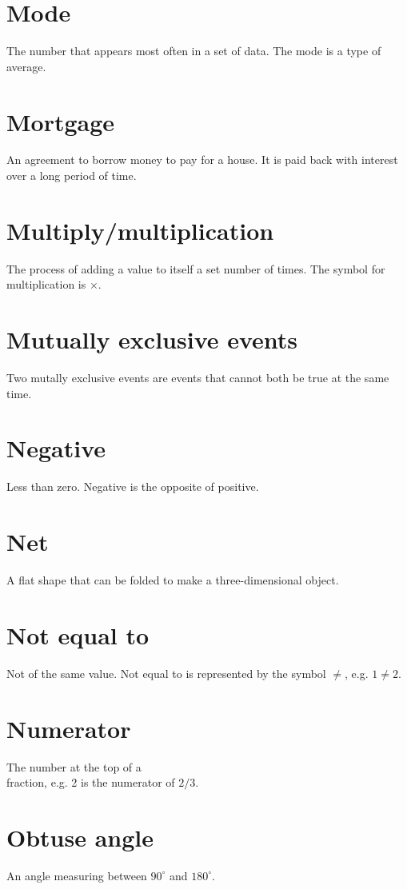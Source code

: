 \documentclass[10pt]{article}
\begin{document}
\section*{Mode}
The number that appears most often in a set of data. The mode is a type of average.

\section*{Mortgage}
An agreement to borrow money to pay for a house. It is paid back with interest over a long period of time.

\section*{Multiply/multiplication}
The process of adding a value to itself a set number of times. The symbol for multiplication is $\times$.

\section*{Mutually exclusive events}
Two mutally exclusive events are events that cannot both be true at the same time.

\section*{Negative}
Less than zero. Negative is the opposite of positive.

\section*{Net}
A flat shape that can be folded to make a three-dimensional object.

\section*{Not equal to}
Not of the same value. Not equal to is represented by the symbol $\neq$, e.g. $1 \neq 2$.

\section*{Numerator}
The number at the top of a\\
fraction, e.g. 2 is the numerator of $2 / 3$.

\section*{Obtuse angle}
An angle measuring between $90^{\circ}$ and $180^{\circ}$.
\end{document}
